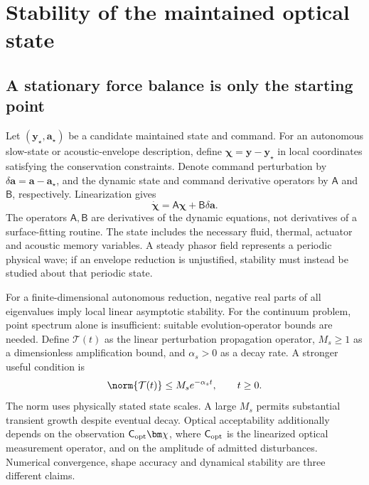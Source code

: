 \section{Stability of the maintained optical state}\label{sec:stability}

\subsection{A stationary force balance is only the starting point}
Let $(\bm y_\star,\bm a_\star)$ be a candidate maintained state and command.
For an autonomous slow-state or acoustic-envelope description, define
$\bm\chi=\bm y-\bm y_\star$ in local coordinates satisfying the conservation
constraints. Denote command perturbation by $\delta\bm a=\bm a-\bm a_\star$,
and the dynamic state and command derivative operators by $\mathsf A$ and
$\mathsf B$, respectively. Linearization gives
\begin{equation}
 \dot{\bm\chi}=\mathsf A\bm\chi+\mathsf B\delta\bm a.
 \label{eq:linear-state}
\end{equation}
The operators $\mathsf A,\mathsf B$ are derivatives of the dynamic equations,
not derivatives of a surface-fitting routine. The state includes the necessary
fluid, thermal, actuator and acoustic memory variables. A steady phasor field
represents a periodic physical wave; if an envelope reduction is unjustified,
stability must instead be studied about that periodic state.

For a finite-dimensional autonomous reduction, negative real parts of all
eigenvalues imply local linear asymptotic stability. For the continuum problem,
point spectrum alone is insufficient: suitable evolution-operator bounds are
needed. Define $\mathcal T(t)$ as the linear perturbation propagation operator,
$M_s\geq1$ as a dimensionless amplification bound, and $\alpha_s>0$ as a decay
rate. A stronger useful condition is
\begin{equation}
 \norm{\mathcal T(t)}\leq M_s e^{-\alpha_s t},\qquad t\geq0.
 \label{eq:semigroup-bound}
\end{equation}
The norm uses physically stated state scales. A large $M_s$ permits substantial
transient growth despite eventual decay. Optical acceptability additionally
depends on the observation $\mathsf C_{\rm opt}\bm\chi$, where
$\mathsf C_{\rm opt}$ is the linearized optical measurement operator, and on
the amplitude of admitted disturbances. Numerical convergence, shape accuracy
and dynamical stability are three different claims.

